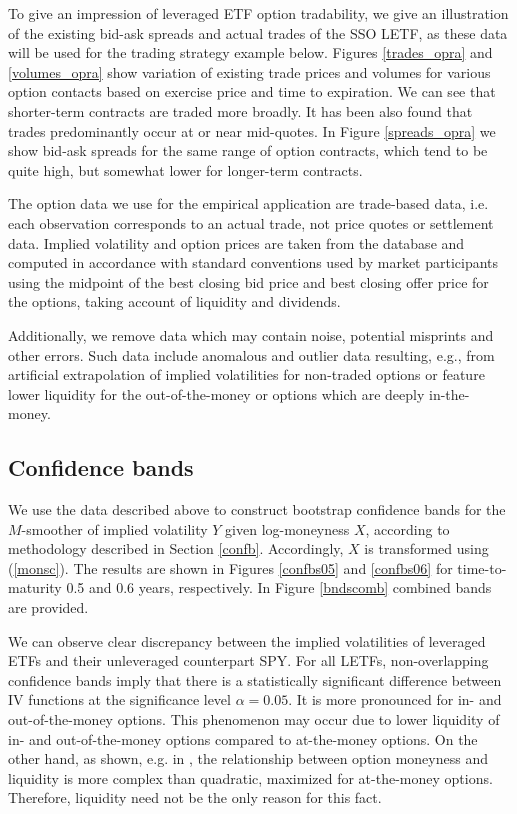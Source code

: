 \documentclass{rQUF2e}
\theoremstyle{plain}
\theoremstyle{definition}
\begin{document}
	To give an impression of leveraged ETF option tradability, we give an illustration of the existing bid-ask spreads and actual trades of the SSO LETF, as these data will be used for the trading strategy example below. Figures \ref{trades_opra} and \ref{volumes_opra} show variation of existing trade prices and volumes for various option contacts based on exercise price and time to expiration. We can see that shorter-term contracts are traded more broadly. It has been also found that trades predominantly occur at or near mid-quotes. In Figure \ref{spreads_opra} we show bid-ask spreads for the same range of option contracts, which tend to be quite high, but somewhat lower for longer-term contracts. 
	
	The option data we use for the empirical application are trade-based data, i.e. each observation corresponds to an actual trade, not price quotes or settlement data. Implied volatility and option prices are taken from the database and computed in accordance with standard conventions used by market participants using the midpoint of the best closing bid price and best closing offer price for the options, taking account of liquidity and dividends.
	
	Additionally, we remove data which may contain noise, potential misprints and other errors. Such data include anomalous and outlier data resulting, e.g., from artificial extrapolation of implied volatilities for non-traded options or feature lower liquidity for the out-of-the-money or options which are deeply in-the-money.
	
	
	\subsection{Confidence bands}
	\label{confb_appl}
	
	We use the data described above to construct bootstrap confidence bands for the $M$-smoother of implied volatility $Y$ given log-moneyness $X$, according to methodology described in Section \ref{confb}. Accordingly, $X$ is transformed using (\ref{monsc}). The results are shown in Figures \ref{confbs05} and \ref{confbs06} for time-to-maturity 0.5 and 0.6 years, respectively. In Figure \ref{bndscomb} combined bands are provided.
	
	We can observe clear discrepancy between the implied volatilities of leveraged ETFs and their unleveraged counterpart SPY. For all LETFs, non-overlapping confidence bands imply that there is a statistically significant difference between IV functions at the significance level $\alpha = 0.05$. It is more pronounced for in- and out-of-the-money options. This phenomenon may occur due to lower liquidity of in- and out-of-the-money options compared to at-the-money options. On the other hand, as shown, e.g. in \citet{etling_miller}, the relationship between option moneyness and liquidity is more complex than quadratic, maximized for at-the-money options. Therefore, liquidity need not be the only reason for this fact.
	
\end{document}
